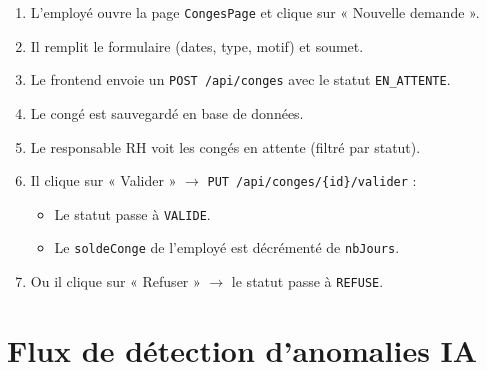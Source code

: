 \documentclass[a4paper,12pt]{report}
\begin{document}
\begin{enumerate}
  \item L'employé ouvre la page \texttt{CongesPage} et clique sur « Nouvelle demande ».
  \item Il remplit le formulaire (dates, type, motif) et soumet.
  \item Le frontend envoie un \texttt{POST /api/conges} avec le statut \texttt{EN\_ATTENTE}.
  \item Le congé est sauvegardé en base de données.
  \item Le responsable RH voit les congés en attente (filtré par statut).
  \item Il clique sur « Valider » $\rightarrow$ \texttt{PUT /api/conges/\{id\}/valider} :
  \begin{itemize}
    \item Le statut passe à \texttt{VALIDE}.
    \item Le \texttt{soldeConge} de l'employé est décrémenté de \texttt{nbJours}.
  \end{itemize}
  \item Ou il clique sur « Refuser » $\rightarrow$ le statut passe à \texttt{REFUSE}.
\end{enumerate}

\section{Flux de détection d'anomalies IA}
\end{document}
